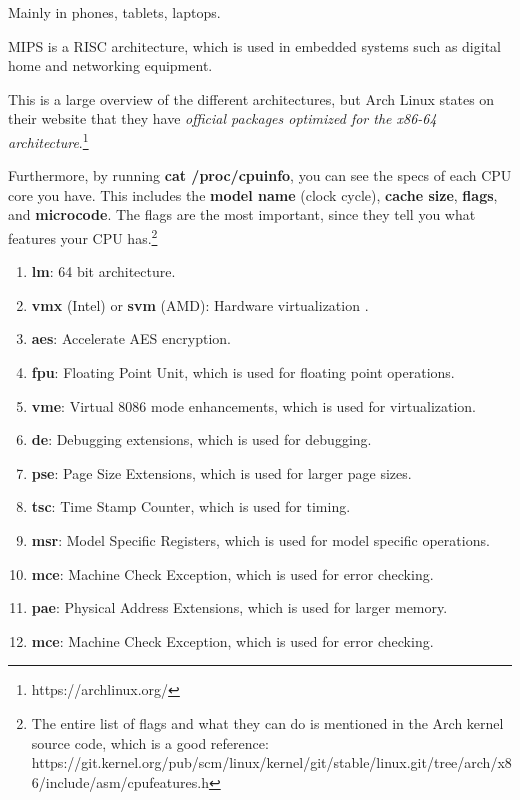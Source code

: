 \documentclass{article}
\begin{document}
    \begin{example}
      Mainly in phones, tablets, laptops. 
    \end{example}

    \begin{example}
      MIPS is a RISC architecture, which is used in embedded systems such as digital home and networking equipment. 
    \end{example}

    This is a large overview of the different architectures, but Arch Linux states on their website that they have \textit{official packages optimized for the x86-64 architecture}.\footnote{https://archlinux.org/} 

    Furthermore, by running \textbf{cat /proc/cpuinfo}, you can see the specs of each CPU core you have. This includes the \textbf{model name} (clock cycle), \textbf{cache size}, \textbf{flags}, and \textbf{microcode}. The flags are the most important, since they tell you what features your CPU has.\footnote{The entire list of flags and what they can do is mentioned in the Arch kernel source code, which is a good reference: https://git.kernel.org/pub/scm/linux/kernel/git/stable/linux.git/tree/arch/x86/include/asm/cpufeatures.h} 
    \begin{enumerate} 
      \item \textbf{lm}: 64 bit architecture. 
      \item \textbf{vmx} (Intel) or \textbf{svm} (AMD): Hardware virtualization . 
      \item \textbf{aes}: Accelerate AES encryption. 
      \item \textbf{fpu}: Floating Point Unit, which is used for floating point operations. 
      \item \textbf{vme}: Virtual 8086 mode enhancements, which is used for virtualization. 
      \item \textbf{de}: Debugging extensions, which is used for debugging. 
      \item \textbf{pse}: Page Size Extensions, which is used for larger page sizes. 
      \item \textbf{tsc}: Time Stamp Counter, which is used for timing. 
      \item \textbf{msr}: Model Specific Registers, which is used for model specific operations. 
      \item \textbf{mce}: Machine Check Exception, which is used for error checking. 
      \item \textbf{pae}: Physical Address Extensions, which is used for larger memory. 
      \item \textbf{mce}: Machine Check Exception, which is used for error checking. 

    \end{enumerate}
\end{document}
